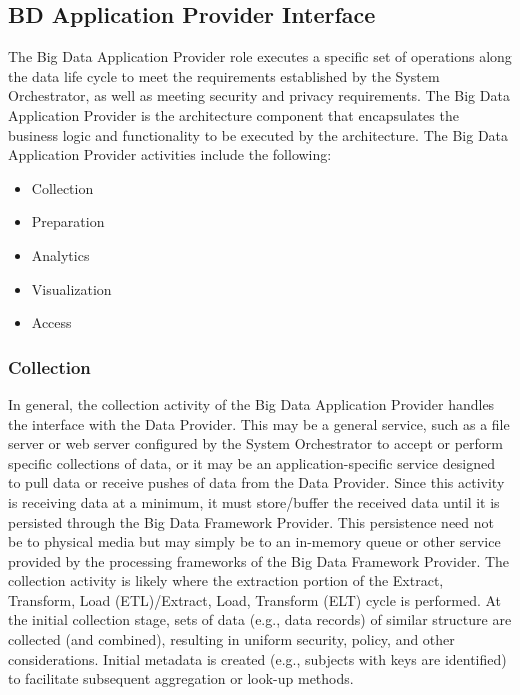 \documentclass[11pt]{article}
\begin{document}
\subsection{BD Application Provider Interface}

The Big Data Application Provider role executes a specific set of operations along the data life cycle to 
meet the requirements established by the System Orchestrator, as well as meeting security and privacy 
requirements. The Big Data Application Provider is the architecture component that encapsulates the 
business logic and functionality to be executed by the architecture. The Big Data Application Provider 
activities include the following:

\begin{itemize}
\item	Collection
\item	Preparation
\item	Analytics
\item	Visualization
\item	Access
\end{itemize}


\subsubsection{Collection}

In general, the collection activity of the Big Data Application Provider handles the interface with the Data 
Provider. This may be a general service, such as a file server or web server configured by the System 
Orchestrator to accept or perform specific collections of data, or it may be an application-specific service 
designed to pull data or receive pushes of data from the Data Provider. Since this activity is receiving data 
at a minimum, it must store/buffer the received data until it is persisted through the Big Data Framework 
Provider. This persistence need not be to physical media but may simply be to an in-memory queue or 
other service provided by the processing frameworks of the Big Data Framework Provider. The collection 
activity is likely where the extraction portion of the Extract, Transform, Load (ETL)/Extract, Load, 
Transform (ELT) cycle is performed. At the initial collection stage, sets of data (e.g., data records) of 
similar structure are collected (and combined), resulting in uniform security, policy, and other 
considerations. Initial metadata is created (e.g., subjects with keys are identified) to facilitate subsequent 
aggregation or look-up methods.
\end{document}
